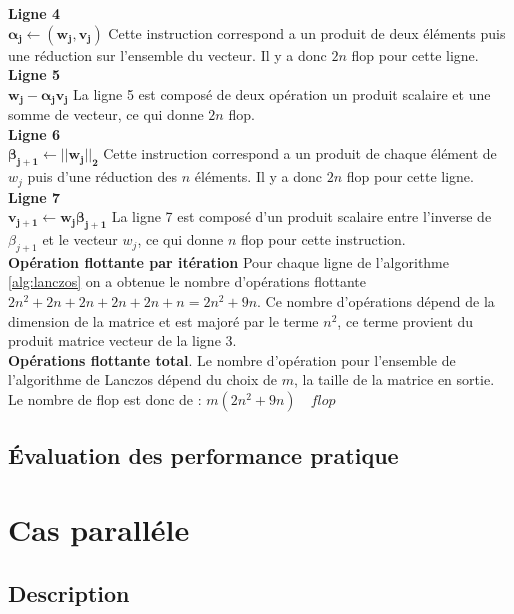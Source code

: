 \documentclass[11pt,french]{article}
\begin{document}
	\noindent \textbf{Ligne  4}\\
	$\boldsymbol {\alpha_j \gets (w_j,v_j)}$
	Cette instruction correspond a un produit de deux éléments puis une réduction sur l'ensemble du vecteur. Il y a donc $2n$ flop pour cette ligne. \\
	
	\noindent\textbf{Ligne  5}\\
	$\boldsymbol {w_j - \boldsymbol{\alpha_j} v_j}$
	La ligne 5 est composé de deux  opération un produit scalaire et une somme de vecteur, ce qui donne $2n$ flop. \\
	
	\noindent\textbf{Ligne  6}\\
	$\boldsymbol {\beta_{j+1} \gets || w_j||_2}$
	Cette instruction correspond a un produit de chaque élément de $w_j$ puis d'une réduction des $n$ éléments. Il y a donc $2n$ flop pour cette ligne.  \\
	
	\noindent\textbf{Ligne  7}\\
	$\boldsymbol {v_{j+1} \gets w_j \beta_{j+1}}$
	La ligne 7 est composé d'un produit scalaire entre l’inverse de $\beta_{j+1}$ et le vecteur $w_j$, ce qui donne $n$ flop pour cette instruction. \\ 
	
	\noindent\textbf{Opération flottante par itération}
	Pour chaque ligne de l'algorithme \ref{alg:lanczos} on a obtenue le nombre d’opérations flottante  $2n^2 + 2n + 2n +2n +2n +n = 2n^2 + 9n$. Ce nombre d’opérations dépend de la dimension de la matrice et est majoré par le terme $n^2$, ce terme provient du produit matrice vecteur de la ligne 3. \\
	
	\noindent \textbf{Opérations flottante total}. Le nombre d’opération pour l'ensemble de l'algorithme de Lanczos dépend du choix de $m$, la taille de la matrice en sortie.\\ 
	Le nombre de flop est donc de : $  m(2n^2 + 9n) \quad flop $
	
	\subsection{Évaluation des performance pratique}
	
	\section{Cas paralléle}
	
	\subsection{Description}
	
\end{document}
